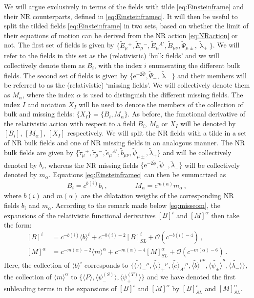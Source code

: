 \documentclass[a4paper,10pt,openany]{article}
\def\rme{\mathrm{e}}
\begin{document}
	We will argue exclusively in terms of the fields with tilde \eqref{eq:Einsteinframe} and their NR counterparts, defined in \eqref{eq:Einsteinframec}. It will then be useful to split the tilded fields \eqref{eq:Einsteinframe} in two sets, based on whether the limit of their equations of motion can be derived from the NR action \eqref{eq:NRaction} or not. The first set of fields is given by $\{\tilde{E}_\mu{}^{+}, \tilde{E}_\mu{}^{-}, \tilde{E}_\mu{}^{A'}, \tilde{B}_{\mu\nu}, \tilde{\Psi}_{\mu \pm}, \tilde{\uplambda}_+\}$. We will refer to the fields in this set as the (relativistic) `bulk fields' and we will collectively denote them as $B_i$, with the index $i$ enumerating the different bulk fields. The second set of fields is given by $\{\rme^{-2\tilde\Phi}, \tilde{\Psi}_-, \tilde{\uplambda}_-\}$ and their members will be referred to as the (relativistic) `missing fields'. We will collectively denote them as $M_\alpha$, where the index $\alpha$ is used to distinguish the different missing fields. The index $I$ and notation $X_I$ will be used to denote the members of the collection of bulk and missing fields: $\{X_I\} = \{B_i, M_\alpha\}$. As before, the functional derivative of the relativistic action with respect to a field $B_i$, $M_\alpha$ or $X_I$ will be denoted by $[B_i]$, $[M_\alpha]$, $[X_I]$ respectively. We will split the NR fields with a tilde in a set of NR bulk fields and one of NR missing fields in an analogous manner. The NR bulk fields are given by $\{\tilde{\tau}_\mu{}^+, \tilde{\tau}_\mu{}^-, \tilde{e}_\mu{}^{A'}, \tilde{b}_{\mu\nu}, \tilde{\psi}_{\mu\pm}, \tilde{\lambda}_+\}$ and will be collectively denoted by $b_i$, whereas the NR missing fields $\{\rme^{-2\tilde{\phi}}, \tilde{\psi}_-, \tilde{\lambda}_-\}$ will be collectively denoted by $m_\alpha$. Equations \eqref{eq:Einsteinframec} can then be summarized as
	\begin{align} \label{eq:expBM}
		B_i = c^{b(i)} b_i \,, \qquad \qquad M_\alpha = c^{m(\alpha)} m_\alpha \,,
	\end{align}
	where $b(i)$ and $m(\alpha)$ are the dilatation weigths of the corresponding NR fields $b_i$ and $m_\alpha$. According to the remark made below \eqref{eq:misseom}, the expansions of the relativistic functional derivatives $[B]^i$ and $[M]^\alpha$ then take the form:
	\begin{align} \label{eq:expBMeom}
		[B]^i &= c^{-b(i)} \langle b \rangle^i + c^{-b(i) - 2} [B]_{SL}^i + \mathcal{O}(c^{-b(i) - 4}) \,, \nonumber \\ [M]^\alpha &= c^{-m(\alpha) - 2} \langle m \rangle^\alpha + c^{-m(\alpha) - 4} [M]_{SL}^\alpha + \mathcal{O}(c^{-m(\alpha) - 6})  \,.
	\end{align}
	Here, the collection of $\langle b \rangle^i$ corresponds to $\{\widetilde{\langle \tau\rangle}_-{}^\mu, \widetilde{\langle \tau\rangle}_+{}^\mu, \widetilde{\langle e\rangle}_{A'}{}^\mu, \widetilde{\langle b\rangle}^{\mu\nu}, \widetilde{\langle\psi_\pm\rangle}^\mu, \widetilde{\langle\lambda_-\rangle}\}$, the collection of $\langle m \rangle^\alpha$ to $\{\langle P \rangle, \langle\psi_-^{(S)}\rangle, \langle \psi_+^{(T)}\rangle\}$ and we have denoted the first subleading terms in the expansions of $[B]^i$ and $[M]^\alpha$ by $[B]^i_{SL}$ and $[M]^\alpha_{SL}$.
	
\end{document}

